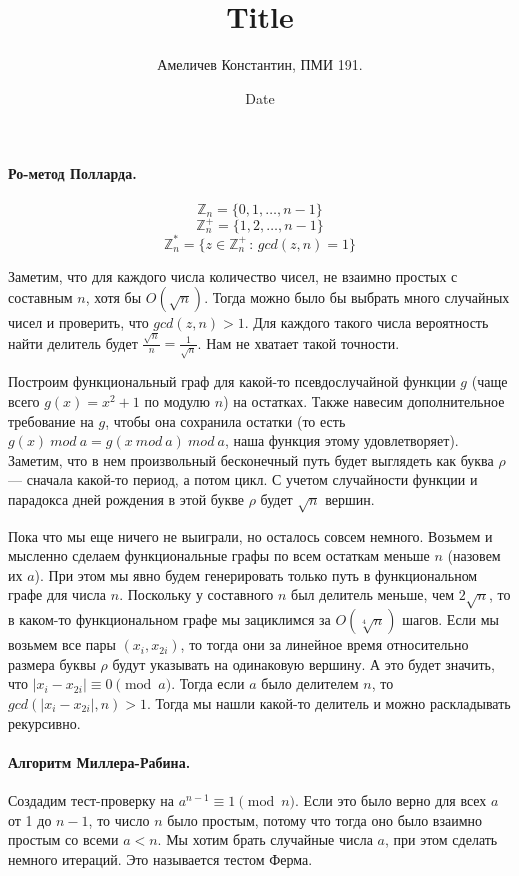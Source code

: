 \documentclass[12pt]{article}
\title{Title}
\author{Амеличев Константин, ПМИ 191.}
\date{Date}
\begin{document}
\paragraph{Ро-метод Полларда.}

$$\mathbb{Z}_n = \{0, 1, \ldots, n - 1\}$$
$$\mathbb{Z}_n^+ = \{1, 2, \ldots, n - 1\}$$
$$\mathbb{Z}_n^* = \{z \in \mathbb{Z}_n^+\,:\,gcd(z, n) = 1\}$$

Заметим, что для каждого числа количество чисел, не взаимно простых с составным $n$, хотя бы $O(\sqrt{n})$. Тогда можно было бы выбрать много случайных чисел и проверить, что $gcd(z, n) > 1$. Для каждого такого числа вероятность найти делитель будет $\frac{\sqrt{n}}{n} = \frac{1}{\sqrt{n}}$. Нам не хватает такой точности.

Построим функциональный граф для какой-то псевдослучайной функции $g$ (чаще всего $g(x) = x^2 + 1$ по модулю $n$) на остатках. Также навесим дополнительное требование на $g$, чтобы она сохранила остатки (то есть $g(x)\ mod\ a = g(x\ mod\ a)\ mod\ a$, наша функция этому удовлетворяет). Заметим, что в нем произвольный бесконечный путь будет выглядеть как буква $\rho$ --- сначала какой-то период, а потом цикл. С учетом случайности функции и парадокса дней рождения в этой букве $\rho$ будет $\sqrt{n}$ вершин.

Пока что мы еще ничего не выиграли, но осталось совсем немного. Возьмем и мысленно сделаем функциональные графы по всем остаткам меньше $n$ (назовем их $a$). При этом мы явно будем генерировать только путь в функциональном графе для числа $n$. Поскольку у составного $n$ был делитель меньше, чем $2\sqrt{n}$, то в каком-то функциональном графе мы зациклимся за $O(\sqrt[4]{n})$ шагов. Если мы возьмем все пары $(x_i, x_{2i})$, то тогда они за линейное время относительно размера буквы $\rho$ будут указывать на одинаковую вершину. А это будет значить, что $|x_i - x_{2i}| \equiv 0 \pmod{a}$. Тогда если $a$  было делителем $n$, то $gcd(|x_i - x_{2i}|, n) > 1$. Тогда мы нашли какой-то делитель и можно раскладывать рекурсивно.

\paragraph{Алгоритм Миллера-Рабина.} Создадим тест-проверку на $a^{n-1} \equiv 1 \pmod{n}$. Если это было верно для всех $a$ от 1 до $n - 1$, то число $n$ было простым, потому что тогда оно было взаимно простым со всеми $a < n$. Мы хотим брать случайные числа $a$, при этом сделать немного итераций. Это называется тестом Ферма.
\end{document}
